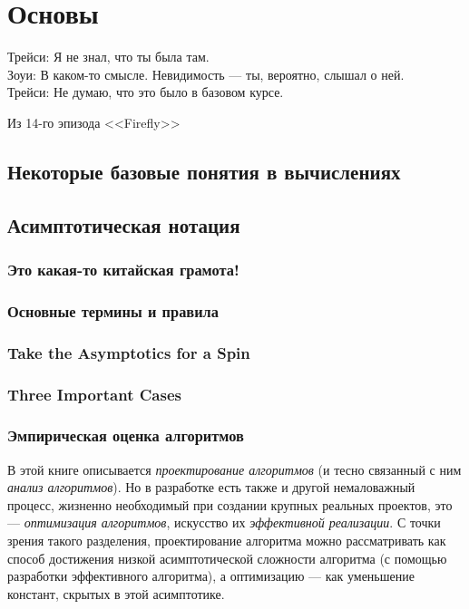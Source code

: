 \chapter{Основы}
\label{chap:basics}

\epigraph{Трейси: Я не знал, что ты была там.\\
Зоуи: В каком-то смысле. Невидимость — ты, вероятно, слышал о ней.\\
Трейси: Не думаю, что это было в базовом курсе.
}{Из 14-го эпизода <<Firefly>>}



\section{Некоторые базовые понятия в вычислениях}

\section{Асимптотическая нотация}
\subsection{Это какая-то китайская грамота!}
\subsection{Основные термины и правила}
\subsection{Take the Asymptotics for a Spin }
\subsection{Three Important Cases}
\subsection{Эмпирическая оценка алгоритмов}
\label{sec:empirical-evaluation}

В этой книге описывается\textit{ проектирование алгоритмов} (и тесно связанный с ним\textit{ анализ алгоритмов}). Но в разработке есть также и другой немаловажный процесс, жизненно необходимый при создании крупных реальных проектов, это — \textit{оптимизация алгоритмов}, искусство их \textit{эффективной реализации}. С точки зрения такого разделения, проектирование алгоритма можно рассматривать как способ достижения низкой асимптотической сложности алгоритма (с помощью разработки эффективного алгоритма), а оптимизацию — как уменьшение констант, скрытых в этой асимптотике.

